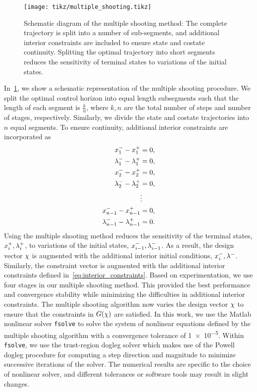 \begin{figure}
    \centering
    \texttt{[image: tikz/multiple\_shooting.tikz]}
    \caption{Schematic diagram of the multiple shooting method:
        The complete trajectory is split into a number of sub-segments, and additional interior constraints are included to ensure state and costate continuity.
        Splitting the optimal trajectory into short segments reduces the sensitivity of terminal states to variations of the initial states.\label{fig:multiple shooting}}
\end{figure}

In~\cref{fig:multiple shooting}, we show a schematic representation of the multiple shooting procedure.
We split the optimal control horizon into equal length subsegments such that the length of each segment is \( \frac{k}{n} \), where \( k, n \) are the total number of steps and number of stages, respectively.
Similarly, we divide the state and costate trajectories into \( n \) equal segments. 
To ensure continuity, additional interior constraints are incorporated as
\begin{align}\label{eq:interior_constraints}
        x_1^{-} - x_1^{+} &= 0 , \nonumber\\ 
        \lambda_1^{-} - \lambda_1^{+} &= 0 , \nonumber\\
        x_2^{-} - x_2^{+} &= 0 , \nonumber\\ 
        \lambda_2^{-} - \lambda_2^{+} &= 0 , \nonumber\\
        &\vdots \nonumber \nonumber\\
        x_{n-1}^{-} - x_{n-1}^{+} &= 0 , \nonumber\\ 
        \lambda_{n-1}^{-} - \lambda_{n-1}^{+} &= 0.
\end{align}
Using the multiple shooting method reduces the sensitivity of the terminal states, \( x_i^{+}, \lambda_i^{+}\), to variations of the initial states, \(x_{i-1}^{-}, \lambda_{i-1}^{-}\).
As a result, the design vector \( \chi \) is augmented with the additional interior initial conditions, \( x_i^{-}, \lambda^{-}\).
Similarly, the constraint vector is augmented with the additional interior constraints defined in~\cref{eq:interior_constraints}.
Based on experimentation, we use four stages in our multiple shooting method.
This provided the best performance and convergence stability while minimizing the difficulties in additional interior constraints.
The multiple shooting algorithm now varies the design vector \( \chi\) to ensure that the constraints in \( G(\chi) \) are satisfied.
In this work, we use the Matlab nonlinear solver \texttt{fsolve} to solve the system of nonlinear equations defined by the multiple shooting algorithm with a convergence tolerance of \num{1e-5}.
Within \texttt{fsolve}, we use the trust-region dogleg solver which makes use of the Powell dogleg procedure for computing a step direction and magnitude to minimize successive iterations of the solver.
The numerical results are specific to the choice of nonlinear solver, and different tolerances or software tools may result in slight changes.

